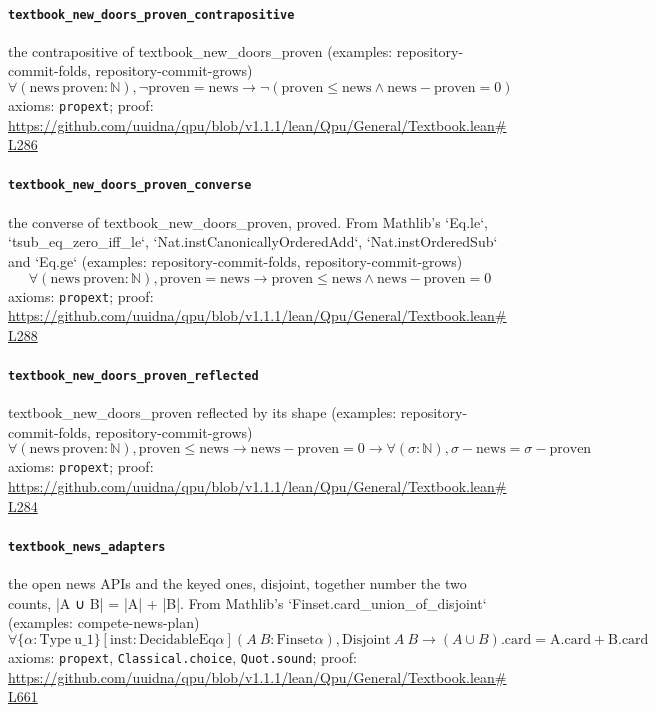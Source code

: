 \documentclass[11pt]{article}
\begin{document}
\paragraph{\texttt{textbook\_new\_doors\_proven\_contrapositive}}
the contrapositive of textbook\_new\_doors\_proven (examples: repository-commit-folds, repository-commit-grows)
\[ \forall (\mathrm{news}\ \mathrm{proven} : \mathbb{N}), \neg \mathrm{proven} = \mathrm{news} \to \neg (\mathrm{proven} \le \mathrm{news} \land \mathrm{news} - \mathrm{proven} = 0) \]
\noindent axioms: \texttt{propext}; proof: \url{https://github.com/uuidna/qpu/blob/v1.1.1/lean/Qpu/General/Textbook.lean\#L286}

\paragraph{\texttt{textbook\_new\_doors\_proven\_converse}}
the converse of textbook\_new\_doors\_proven, proved. From Mathlib's `Eq.le`, `tsub\_eq\_zero\_iff\_le`, `Nat.instCanonicallyOrderedAdd`, `Nat.instOrderedSub` and `Eq.ge` (examples: repository-commit-folds, repository-commit-grows)
\[ \forall (\mathrm{news}\ \mathrm{proven} : \mathbb{N}), \mathrm{proven} = \mathrm{news} \to \mathrm{proven} \le \mathrm{news} \land \mathrm{news} - \mathrm{proven} = 0 \]
\noindent axioms: \texttt{propext}; proof: \url{https://github.com/uuidna/qpu/blob/v1.1.1/lean/Qpu/General/Textbook.lean\#L288}

\paragraph{\texttt{textbook\_new\_doors\_proven\_reflected}}
textbook\_new\_doors\_proven reflected by its shape (examples: repository-commit-folds, repository-commit-grows)
\[ \forall (\mathrm{news}\ \mathrm{proven} : \mathbb{N}), \mathrm{proven} \le \mathrm{news} \to \mathrm{news} - \mathrm{proven} = 0 \to \forall (\sigma : \mathbb{N}), \sigma - \mathrm{news} = \sigma - \mathrm{proven} \]
\noindent axioms: \texttt{propext}; proof: \url{https://github.com/uuidna/qpu/blob/v1.1.1/lean/Qpu/General/Textbook.lean\#L284}

\paragraph{\texttt{textbook\_news\_adapters}}
the open news APIs and the keyed ones, disjoint, together number the two counts, |A ∪ B| = |A| + |B|. From Mathlib's `Finset.card\_union\_of\_disjoint` (examples: compete-news-plan)
\[ \forall \{\alpha : \mathrm{Type}\ \mathrm{u\_1}\} [\mathrm{inst} : \mathrm{DecidableEq} \alpha ] (A\ B : \mathrm{Finset} \alpha ), \mathrm{Disjoint}\ A\ B \to (A \cup B)\mathrm{.card} = \mathrm{A.card} + \mathrm{B.card} \]
\noindent axioms: \texttt{propext}, \texttt{Classical.choice}, \texttt{Quot.sound}; proof: \url{https://github.com/uuidna/qpu/blob/v1.1.1/lean/Qpu/General/Textbook.lean\#L661}
\end{document}
